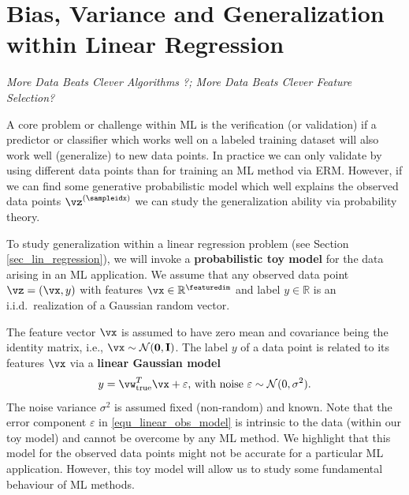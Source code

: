 \documentclass[12pt]{report}
\begin{document}
\section{Bias, Variance and Generalization within Linear Regression} 
\label{sec_gen_linreg}
\emph{More Data Beats Clever Algorithms ?; More Data Beats Clever Feature Selection?}

A core problem or challenge within ML is the verification (or validation) if a 
predictor or classifier which works well on a labeled training dataset will also 
work well (generalize) to new data points. In practice we can only validate 
by using different data points than for training an ML method via ERM. However, 
if we can find some generative probabilistic model which well explains the 
observed data points $\vz^{(\sampleidx)}$ we can study the generalization 
ability via probability theory. 

To study generalization within a linear regression problem 
(see Section \ref{sec_lin_regression}), we will invoke a {\bf probabilistic toy model} 
for the data arising in an ML application. We assume that 
any observed data point $\vz=(\vx,y)$ with features $\vx \in \mathbb{R}^{\featuredim}$ 
and label $y \in \mathbb{R}$ is an i.i.d.\ realization of a 
Gaussian random vector. 

The feature vector $\vx$ is assumed to have zero mean and covariance 
being the identity matrix, i.e., $\vx \sim \mathcal{N}(\mathbf{0}, \mathbf{I})$. 
The label $y$ of a data point is related to its features $\vx$ via a 
{\bf linear Gaussian model} 
\begin{equation} 
\label{equ_linear_obs_model}
y = \vw_{\rm true}^{T}  \vx + \varepsilon \mbox{, with noise } \varepsilon \sim \mathcal{N}(0,\sigma^{2}).
\end{equation} 
The noise variance $\sigma^{2}$ is assumed fixed (non-random) and known. 
Note that the error component $\varepsilon$ in \eqref{equ_linear_obs_model} 
is intrinsic to the data (within our toy model) and cannot be overcome by 
any ML method. We highlight that this model for the observed data 
points might not be accurate for a particular ML application. However, 
this toy model will allow us to study some fundamental behaviour of ML methods. 
\end{document}
